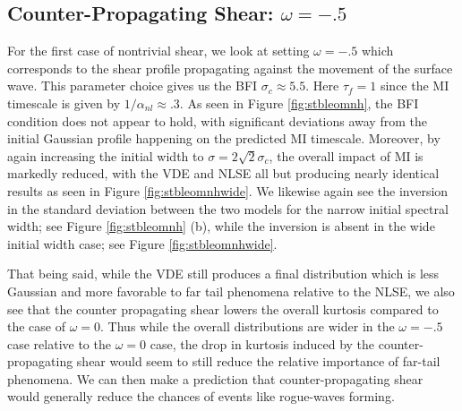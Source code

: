 \documentclass[a4paper,11pt]{article}
\begin{document}
\subsection*{Counter-Propagating Shear: $\omega = -.5$}

For the first case of nontrivial shear, we look at setting $\omega=-.5$ which corresponds to the shear profile propagating against the movement of the surface wave.  This parameter choice gives us the BFI $\sigma_{c} \approx 5.5$.  Here $\tau_{f}=1$ since the MI timescale is given by $1/\alpha_{nl}\approx .3$.  As seen in Figure \ref{fig:stbleomnh}, the BFI condition does not appear to hold, with significant deviations away from the initial Gaussian profile happening on the predicted MI timescale.  Moreover, by again increasing the initial width to $\sigma = 2\sqrt{2}\sigma_{c}$, the overall impact of MI is markedly reduced, with the VDE and NLSE all but producing nearly identical results as seen in Figure \ref{fig:stbleomnhwide}.  We likewise again see the inversion in the standard deviation between the two models for the narrow initial spectral width; see Figure \ref{fig:stbleomnh} (b), while the inversion is absent in the wide initial width case; see Figure \ref{fig:stbleomnhwide}.  

That being said, while the VDE still produces a final distribution which is less Gaussian and more favorable to far tail phenomena relative to the NLSE, we also see that the counter propagating shear lowers the overall kurtosis compared to the case of $\omega=0$.   Thus while the overall distributions are wider in the $\omega=-.5$ case relative to the $\omega=0$ case, the drop in kurtosis induced by the counter-propagating shear would seem to still reduce the relative importance of far-tail phenomena.  We can then make a prediction that counter-propagating shear would generally reduce the chances of events like rogue-waves forming.  
\end{document}
